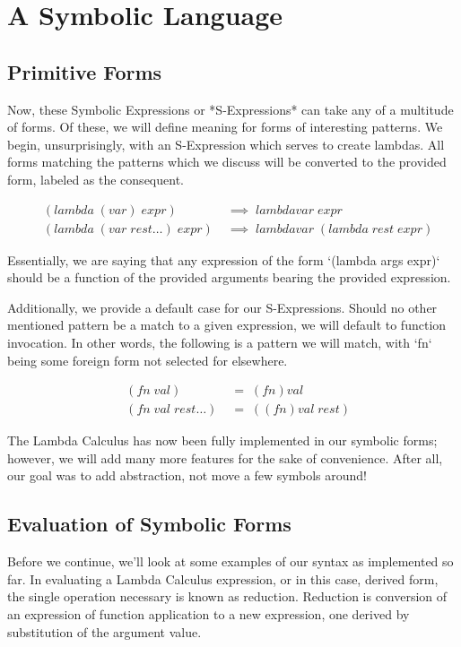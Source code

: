 \section{A Symbolic Language}
\subsection{Primitive Forms}
Now, these Symbolic Expressions or *S-Expressions* can take any of a multitude of
forms. Of these, we will define meaning for forms of interesting patterns. We
begin, unsurprisingly, with an S-Expression which serves to create lambdas. All
forms matching the patterns which we discuss will be converted to the provided
form, labeled as the consequent.

\begin{align*}
& (lambda \; (var) \; expr) \; &\implies \; lambda var \; expr
\\& (lambda \; (var \; rest\dots) \; expr) \; &\implies \; lambda var \; (lambda \; rest \; expr)
\end{align*}

Essentially, we are saying that any expression of the form `(lambda args expr)`
should be a function of the provided arguments bearing the provided expression. 

Additionally, we provide a default case for our S-Expressions. Should no other
mentioned pattern be a match to a given expression, we will default to function
invocation. In other words, the following is a pattern we will match, with `fn`
being some foreign form not selected for elsewhere. 

\begin{align*}
& (fn \; val) \; &= \; (fn)val
\\& (fn \; val \; rest\dots) \; &= \; ((fn)val \; rest)
\end{align*}

The Lambda Calculus has now been fully implemented in our symbolic forms; however, 
we will add many more features for the sake of convenience. After all, our goal
was to add abstraction, not move a few symbols around!


\subsection{Evaluation of Symbolic Forms}
Before we continue, we'll look at some examples of our syntax as implemented so
far. In evaluating a Lambda Calculus expression, or in this case, derived form,
the single operation necessary is known as reduction. Reduction is conversion of
an expression of function application to a new expression, one derived by
substitution of the argument value.

